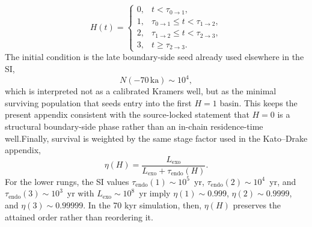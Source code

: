 \documentclass[11pt]{article}
\begin{document}
\begin{equation}H(t)=
\begin{cases}0, & t<\tau_{0\to 1},\\1, & \tau_{0\to 1}\le t<\tau_{1\to 2},\\2, & \tau_{1\to 2}\le t<\tau_{2\to 3},\\3, & t\ge \tau_{2\to 3}.
\end{cases}
\label{eq:S-70ky-Hstair}
\end{equation}The initial condition is the late boundary-side seed already used elsewhere in the SI,
\begin{equation}N(-70\,\mathrm{ka})\sim 10^4,
\label{eq:S-70ky-init}
\end{equation}which is interpreted not as a calibrated Kramers well, but as the minimal surviving population that seeds entry into the first $H{=}1$ basin. This keeps the present appendix consistent with the source-locked statement that $H{=}0$ is a structural boundary-side phase rather than an in-chain residence-time well.Finally, survival is weighted by the same stage factor used in the Kato--Drake appendix,
\begin{equation}\eta(H)=\frac{L_{\mathrm{exo}}}{L_{\mathrm{exo}}+\tau_{\mathrm{endo}}(H)}.
\label{eq:S-70ky-eta}
\end{equation}For the lower rungs, the SI values $\tau_{\mathrm{endo}}(1)\sim 10^5$~yr, $\tau_{\mathrm{endo}}(2)\sim 10^4$~yr, and $\tau_{\mathrm{endo}}(3)\sim 10^3$~yr with $L_{\mathrm{exo}}\sim 10^8$~yr imply $\eta(1)\sim 0.999$, $\eta(2)\sim 0.9999$, and $\eta(3)\sim 0.99999$. In the 70 kyr simulation, then, $\eta(H)$ preserves the attained order rather than reordering it.
\end{document}
